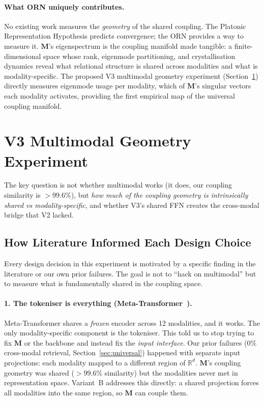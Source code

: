 \documentclass[11pt, a4paper]{article}
\newcommand{\M}{\mathbf{M}}
\newcommand{\R}{\mathbb{R}}
\theoremstyle{plain}
\theoremstyle{remark}
\begin{document}
\paragraph{What ORN uniquely contributes.}
No existing work measures the \emph{geometry} of the shared coupling.
The Platonic Representation Hypothesis predicts convergence; the ORN provides a way to measure it.
$\M$'s eigenspectrum is the coupling manifold made tangible: a finite-dimensional space whose rank, eigenmode partitioning, and crystallisation dynamics reveal what relational structure is shared across modalities and what is modality-specific.
The proposed V3 multimodal geometry experiment (Section~\ref{sec:v3-multimodal-geometry}) directly measures eigenmode usage per modality, which of $\M$'s singular vectors each modality activates, providing the first empirical map of the universal coupling manifold.


\section{V3 Multimodal Geometry Experiment}
\label{sec:v3-multimodal-geometry}

The key question is not whether multimodal works (it does, our coupling similarity is $>99.6\%$), but \emph{how much of the coupling geometry is intrinsically shared vs modality-specific}, and whether V3's shared FFN creates the cross-modal bridge that V2 lacked.

\subsection{How Literature Informed Each Design Choice}

Every design decision in this experiment is motivated by a specific finding in the literature or our own prior failures.
The goal is not to ``hack on multimodal'' but to measure what is fundamentally shared in the coupling space.

\paragraph{1. The tokeniser is everything (Meta-Transformer~\cite{zhang2023metatransformer}).}
Meta-Transformer shares a \emph{frozen} encoder across 12 modalities, and it works.
The only modality-specific component is the tokeniser.
This told us to stop trying to fix $\M$ or the backbone and instead fix the \emph{input interface}.
Our prior failures ($0\%$ cross-modal retrieval, Section~\ref{sec:universal}) happened with separate input projections: each modality mapped to a different region of $\R^d$.
$\M$'s coupling geometry was shared ($>99.6\%$ similarity) but the modalities never met in representation space.
Variant~B addresses this directly: a shared projection forces all modalities into the same region, so $\M$ can couple them.
\end{document}
